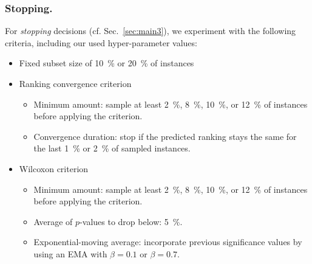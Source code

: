 \documentclass[runningheads]{llncs}
\begin{document}
\subsubsection{Stopping.}
For \emph{stopping} decisions (cf. Sec.~\ref{sec:main3}), we experiment with the following criteria, including our used hyper-parameter values:
\begin{itemize}
  \item Fixed subset size of \SI{10}{\%} or \SI{20}{\%} of instances
  \item Ranking convergence criterion
  \begin{itemize}
    \item Minimum amount: sample at least \SI{2}{\%}, \SI{8}{\%}, \SI{10}{\%}, or \SI{12}{\%} of instances before applying the criterion.
    \item Convergence duration: stop if the predicted ranking stays the same for the last \SI{1}{\%} or \SI{2}{\%} of sampled instances.
  \end{itemize}

  \item Wilcoxon criterion
  \begin{itemize}
    \item Minimum amount: sample at least \SI{2}{\%}, \SI{8}{\%}, \SI{10}{\%}, or \SI{12}{\%} of instances before applying the criterion.
    \item Average of $p$-values to drop below: \SI{5}{\%}.
    \item Exponential-moving average: incorporate previous significance values by using an EMA with $\beta = 0.1$ or $\beta = 0.7$.
  \end{itemize}
\end{itemize}
\end{document}
